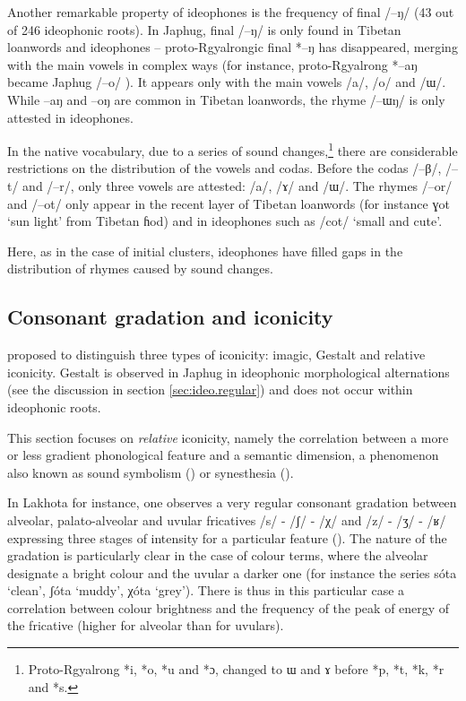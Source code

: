 \documentclass[oldfontcommands,oneside,a4paper,11pt]{article}
\newcommand{\ipa}[1]{{\phon \mbox{#1}}} %
\begin{document}
Another remarkable property of ideophones is the frequency of final /\ipa{--ŋ}/ (43 out of 246 ideophonic roots). In Japhug, final /\ipa{--ŋ}/ is only found in Tibetan loanwords and ideophones -- proto-Rgyalrongic final *--ŋ has disappeared, merging with the main vowels in complex ways  (for instance, proto-Rgyalrong *--aŋ became Japhug /\ipa{--o}/ \citealt[228]{jacques04these}). It appears only with the main vowels /\ipa{a}/, /\ipa{o}/ and /\ipa{ɯ}/. While \ipa{--aŋ} and \ipa{--oŋ} are common in Tibetan loanwords, the rhyme /\ipa{--ɯŋ}/ is only attested in ideophones.

In the native vocabulary, due to a series of sound changes,\footnote{Proto-Rgyalrong *i,  *o, *u and *ɔ, changed to \ipa{ɯ} and \ipa{ɤ} before *p, *t, *k, *r and *s. } there are considerable restrictions on the distribution of the vowels and codas. Before the codas /\ipa{--β}/,  /\ipa{--t}/ and /\ipa{--r}/, only three vowels are attested: /\ipa{a}/, /\ipa{ɤ}/ and /\ipa{ɯ}/. The rhymes    /\ipa{--or}/ and /\ipa{--ot}/ only appear in the recent layer of Tibetan loanwords (for instance \ipa{ɣot} `sun light' from Tibetan \ipa{ɦod}) and in ideophones such as /\ipa{cot}/ `small and cute'.

Here, as in the case of initial clusters, ideophones have filled gaps in the distribution of rhymes caused by sound changes.




\subsection{Consonant gradation and iconicity}
 \citet[47]{dingemanse11ezra} proposed to distinguish three types of iconicity: imagic, Gestalt and relative iconicity. Gestalt is   observed in Japhug in ideophonic morphological alternations (see the discussion in section \ref{sec:ideo.regular}) and does not occur within ideophonic roots. 
 
 This section focuses on \textit{relative} iconicity, namely the correlation between a more or less gradient phonological feature and a semantic dimension, a phenomenon also known as sound symbolism  (\citealt[16]{deloria41})  or synesthesia (\citealt[186-7]{gerner04expressives1}).


  In Lakhota for instance, one observes a very regular consonant gradation between alveolar, palato-alveolar and uvular fricatives /\ipa{s}/ - /\ipa{ʃ}/ - /\ipa{χ}/ and /\ipa{z}/ - /\ipa{ʒ}/ - /\ipa{ʁ}/ expressing three stages of intensity for a particular feature (\citealt[16-18]{deloria41}). The nature of the gradation is particularly clear in the case of colour terms, where the alveolar designate a bright colour and the uvular a darker one (for instance the series \ipa{sóta} `clean', \ipa{ʃóta} `muddy', \ipa{χóta} `grey'). There is thus in this particular case a correlation between colour brightness and   the frequency  of the peak of energy of the fricative (higher for alveolar than for uvulars).
\end{document}
